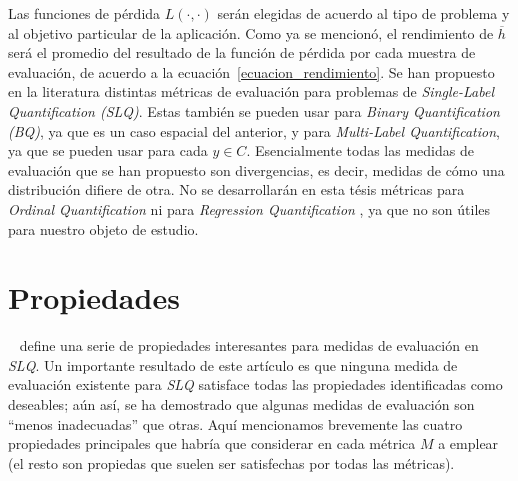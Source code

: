 Las funciones de pérdida $L(\cdot, \cdot)$ serán elegidas de acuerdo al tipo de
problema y al objetivo particular de la aplicación. Como ya se mencionó, el
rendimiento de $\overline{h}$ será el promedio del resultado de la función de
pérdida por cada muestra de evaluación, de acuerdo a la
ecuación~\ref{ecuacion_rendimiento}. Se han propuesto en la literatura distintas
métricas de evaluación para problemas de {\it Single-Label Quantification
(SLQ)}. Estas también se pueden usar para {\it Binary Quantification (BQ)}, ya
que es un caso espacial del anterior, y para {\it Multi-Label Quantification},
ya que se pueden usar para cada $y \in C$. Esencialmente todas las medidas de
evaluación que se han propuesto son divergencias, es decir, medidas de cómo una
distribución difiere de otra. No se desarrollarán en esta tésis métricas para
{\it Ordinal Quantification\/} ni para {\it Regression Quantification }, ya que
no son útiles para nuestro objeto de estudio.

\section{Propiedades}\label{evaluacion:propiedades}

~\citet{sebastiani2020evaluation} define una serie de propiedades interesantes
para medidas de evaluación en {\it SLQ}. Un importante resultado de este
artículo es que ninguna medida de evaluación existente para {\it SLQ\/}
satisface todas las propiedades identificadas como deseables; aún así, se ha
demostrado que algunas medidas de evaluación son “menos inadecuadas” que otras.
Aquí mencionamos brevemente las cuatro propiedades principales que habría que
considerar en cada métrica $M$ a emplear (el resto son propiedas que suelen ser
satisfechas por todas las métricas).

